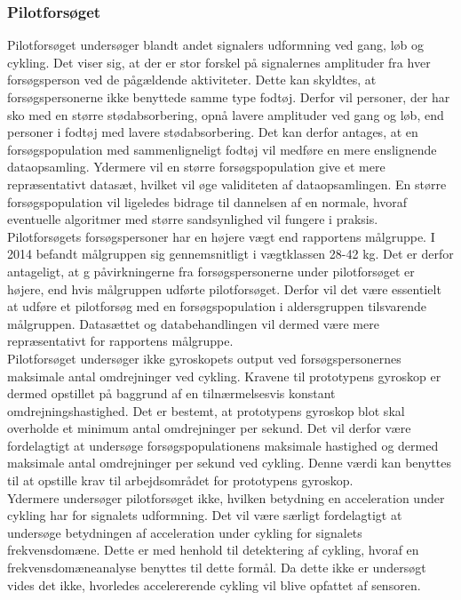 \subsubsection{Pilotforsøget}
Pilotforsøget undersøger blandt andet signalers udformning ved gang, løb og cykling. Det viser sig, at der er stor forskel på signalernes amplituder fra hver forsøgsperson ved de pågældende aktiviteter. Dette kan skyldtes, at forsøgspersonerne ikke benyttede samme type fodtøj. Derfor vil personer, der har sko med en større stødabsorbering, opnå lavere amplituder ved gang og løb, end personer i fodtøj med lavere stødabsorbering. Det kan derfor antages, at en forsøgspopulation med sammenligneligt fodtøj vil medføre en mere enslignende dataopsamling. Ydermere vil en større forsøgspopulation give et mere repræsentativt datasæt, hvilket vil øge validiteten af dataopsamlingen. En større forsøgspopulation vil ligeledes bidrage til dannelsen af en normale, hvoraf eventuelle algoritmer med større sandsynlighed vil fungere i praksis.\\
Pilotforsøgets forsøgspersoner har en højere vægt end rapportens målgruppe. I 2014 befandt målgruppen sig gennemsnitligt i vægtklassen 28-42 kg. \citep{Rigsholspitalet2014} Det er derfor antageligt, at g påvirkningerne fra forsøgspersonerne under pilotforsøget er højere, end hvis målgruppen udførte pilotforsøget. Derfor vil det være essentielt at udføre et pilotforsøg med en forsøgspopulation i aldersgruppen tilsvarende målgruppen. Datasættet og databehandlingen vil dermed være mere repræsentativt for rapportens målgruppe.\\
Pilotforsøget undersøger ikke gyroskopets output ved forsøgspersonernes maksimale antal omdrejninger ved cykling. Kravene til prototypens gyroskop er dermed opstillet på baggrund af en tilnærmelsesvis konstant omdrejningshastighed. Det er bestemt, at prototypens gyroskop blot skal overholde et minimum antal omdrejninger per sekund. Det vil derfor være fordelagtigt at undersøge forsøgspopulationens maksimale hastighed og dermed maksimale antal omdrejninger per sekund ved cykling. Denne værdi kan benyttes til at opstille krav til arbejdsområdet for prototypens gyroskop.\\
Ydermere undersøger pilotforsøget ikke, hvilken betydning en acceleration under cykling har for signalets udformning. Det vil være særligt fordelagtigt at undersøge betydningen af acceleration under cykling for signalets frekvensdomæne. Dette er med henhold til detektering af cykling, hvoraf en frekvensdomæneanalyse benyttes til dette formål. Da dette ikke er undersøgt vides det ikke, hvorledes accelererende cykling vil blive opfattet af sensoren.


